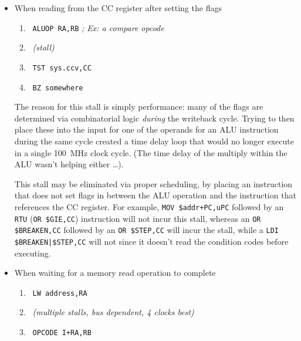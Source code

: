 \documentclass{gqtekspec}
\begin{document}
\begin{itemize}
\item When reading from the CC register after setting the flags
\begin{enumerate}
\item\ {\tt ALUOP RA,RB} {\em ; Ex: a compare opcode}
\item\ {\em (stall)}
\item\ {\tt TST sys.ccv,CC}
\item\ {\tt BZ somewhere}
\end{enumerate}

The reason for this stall is simply performance: many of the flags are
determined via combinatorial logic {\em during} the writeback cycle.
Trying to then place these into the input for one of the operands for an
ALU instruction during the same cycle
created a time delay loop that would no longer execute in a single 100~MHz
clock cycle.  (The time delay of the multiply within the ALU wasn't helping
either \ldots). 

This stall may be eliminated via proper scheduling, by placing an instruction
that does not set flags in between the ALU operation and the instruction
that references the CC register.  For example, {\tt MOV \$addr+PC,uPC}
followed by an {\tt RTU} ({\tt OR \$GIE,CC}) instruction will not incur
this stall, whereas an {\tt OR \$BREAKEN,CC} followed by an {\tt OR \$STEP,CC}
will incur the stall, while a {\tt LDI \$BREAKEN|\$STEP,CC} will not since
it doesn't read the condition codes before executing.

\item When waiting for a memory read operation to complete
\begin{enumerate}
\item\ {\tt LW address,RA}
\item\ {\em (multiple stalls, bus dependent, 4 clocks best)}
\item\ {\tt OPCODE I+RA,RB}
\end{enumerate}


\end{itemize}
\end{document}
